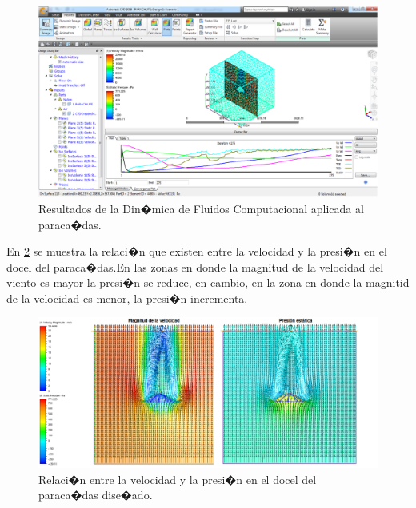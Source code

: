 \documentclass[10pt,a4paper]{book}
\begin{document}
\begin{figure}[H]
\begin{center}
\includegraphics[scale=0.40]{Imagenes/Simulacioncfd1.png}
\caption{Resultados de la Din�mica de Fluidos Computacional aplicada al paraca�das. \label{img:Simulacioncfd1}}
\end{center}
\end{figure} 

En \ref{img:Simulacioncfddos} se  muestra la relaci�n que existen entre la velocidad y la presi�n en el docel del paraca�das.En las zonas en donde la magnitud de la velocidad del viento es mayor la presi�n se reduce, en cambio, en la zona en donde la magnitid de la velocidad es menor, la presi�n incrementa.

\begin{figure}[H]
\begin{center}
\includegraphics[scale=0.40]{Imagenes/Simulacioncfd2.png}
\caption{Relaci�n entre la velocidad y la presi�n en el docel del paraca�das dise�ado. \label{img:Simulacioncfddos}}
\end{center}
\end{figure} 
\end{document}
